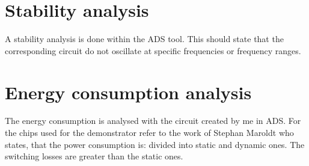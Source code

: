 \section{Stability analysis}
A stability analysis is done within the ADS tool. This should state that the corresponding circuit do not oscillate at specific frequencies or frequency ranges.

\section{Energy consumption analysis}
The energy consumption is analysed with the circuit created by me in ADS. For the chips used for the demonstrator refer to the work of Stephan Maroldt who states, that the power consumption is:  divided into static and dynamic ones. The switching losses are greater than the static ones.
